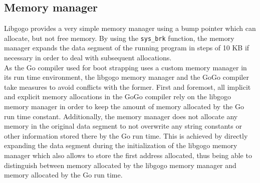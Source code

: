 \documentclass[a4paper]{scrartcl}
\let\section\subsection
\let\subsection\subsubsection
\let\subsubsection\paragraph
\let\paragraph\subparagraph
\let\subparagraph\undefined
\begin{document}
    \section{Memory manager}
      Libgogo provides a very simple memory manager using a bump pointer which can allocate, but not free memory. By using the \texttt{sys\_brk}\cite{var97} function, the memory manager expands the data segment of the running program in steps of 10 KB if necessary in order to deal with subsequent allocations.\\
      As the Go compiler used for boot strapping uses a custom memory manager in its run time environment, the libgogo memory manager and the GoGo compiler take measures to avoid conflicts with the former. First and foremost, all implicit and explicit memory allocations in the GoGo compiler rely on the libgogo memory manager in order to keep the amount of memory allocated by the Go run time constant. Additionally, the memory manager does not allocate any memory in the original data segment to not overwrite any string constants or other information stored there by the Go run time. This is achieved by directly expanding the data segment during the initialization of the libgogo memory manager which also allows to store the first address allocated, thus being able to distinguish between memory allocated by the libgogo memory manager and memory allocated by the Go run time.
\end{document}

